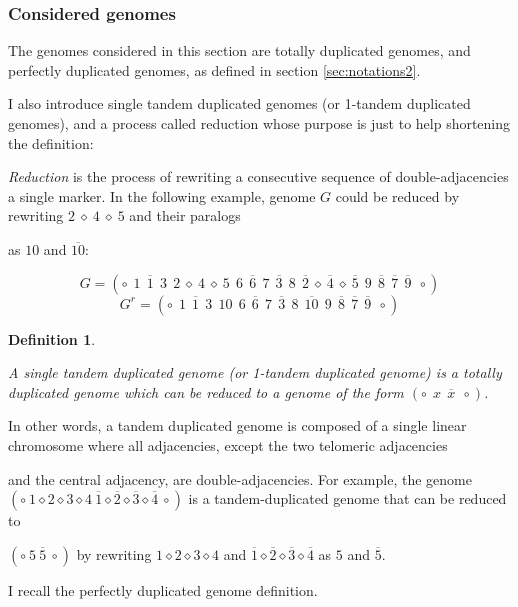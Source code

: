 \documentclass[11pt,final,twoside,nofrench]{thlifl}
\newcommand{\fst}[1]{ \ensuremath{#1} }
\newcommand{\snd}[1]{ \ensuremath{\overline{#1}} }
\newtheorem{definition}{Definition}
\begin{document}
\subsubsection{Considered genomes}
\label{sec:dedouble}

The genomes considered in this section are totally duplicated genomes, and perfectly duplicated genomes, as defined in section \ref{sec:notations2}.

I also introduce single tandem duplicated genomes (or 1-tandem duplicated genomes), and a process called reduction whose purpose is just to help shortening the definition:

\emph{Reduction} is the process of rewriting a consecutive sequence of double-adjacencies a
single marker. In the following example, 
genome $G$ could be reduced by rewriting $\fst{2}~\diamond~\fst{4}~\diamond~\fst{5}$
and their paralogs

as $\fst{10}$ and $\snd{10}$:

$$G =
(\circ~~\fst{1}~~\snd{1}~~\fst{3}~~\fst{2}~\diamond~\fst{4}~\diamond~\fst{5}~~\fst{6}
~~\snd{6}~~\fst{7}~~\snd{3}~~\fst{8}~~\snd{2}~\diamond~\snd{4}~\diamond~\snd{5}~~\fst{
9}~~\snd{8}~~\snd{7}~~\snd{9}~~\circ )$$
$$G^r = (\circ
~~\fst{1}~~\snd{1}~~\fst{3}~~\fst{10}~~\fst{6}~~\snd{6}~~\fst{7}~~\snd{3}~~\fst{
8}~~\snd{10}~~\fst{9}~~\snd{8}~~\snd{7}~~\snd{9}~~\circ )$$

\begin{definition}
\label{def:tandem}

    A \emph{single tandem duplicated genome}  (or \emph{1-tandem duplicated genome}) is a totally
    duplicated genome which can be reduced to a genome of the form
    $(\circ~~\fst{x}~~\snd{x}~~\circ )$.
\end{definition}

In other words, a tandem duplicated genome is composed of a single linear
chromosome where all adjacencies, except the two telomeric adjacencies 

and the central adjacency, are
double-adjacencies.
For example, the genome
$(\circ~\fst{1}\diamond\fst{2}\diamond\fst{3}\diamond\fst{4}~\snd{1}\diamond\snd{2
}\diamond\snd{3}\diamond\snd{4}~\circ)$ is a tandem-duplicated genome that can
be reduced to 

$(\circ~\fst{5}~\snd{5}~\circ )$
by rewriting $\fst{1}\diamond\fst{2}\diamond\fst{3}\diamond\fst{4}$ and
$\snd{1}\diamond\snd{2}\diamond\snd{3}\diamond\snd{4}$ as  $\fst{5}$ and $\snd{5}$.

I recall the perfectly duplicated genome definition.
\end{document}
